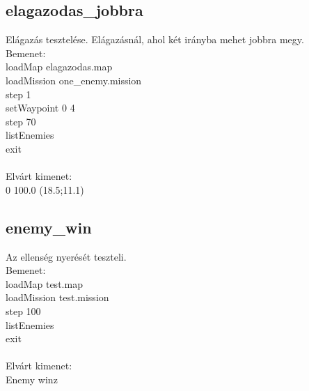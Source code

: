 \subsection{elagazodas\_jobbra}
Elágazás tesztelése.
Elágazásnál, ahol két irányba mehet jobbra megy.\\
Bemenet:\\
loadMap elagazodas.map\\
loadMission one\_enemy.mission\\
step 1\\
setWaypoint 0 4\\
step 70\\
listEnemies\\
exit\\
\\
Elvárt kimenet:\\
0 100.0 (18.5;11.1)\\
\subsection{enemy\_win}
Az ellenség nyerését teszteli.\\
Bemenet:\\
loadMap test.map\\
loadMission test.mission\\
step 100\\
listEnemies\\
exit\\
\\
Elvárt kimenet:\\
Enemy winz\\
